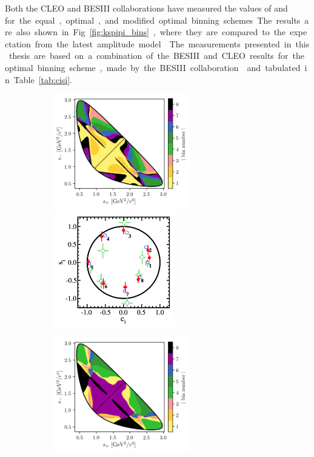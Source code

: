 Both the CLEO and BESIII collaborations have measured the values of \ci and \si for the equal, optimal, and modified optimal binning schemes. The results are also shown in Fig.~\ref{fig:kspipi_bins}, where they are  compared to the expectation from the latest amplitude model~\cite{Belle2018}. The measurements presented in this thesis are based on a combination of the BESIII and CLEO results for the optimal binning scheme, made by the BESIII collaboration~\cite{BESCISI} and tabulated in Table~\ref{tab:cisi}. 

\begin{figure}[p]
    \centering
    \begin{subfigure}{\columnwidth}
        \centering
        \includegraphics[height=5cm]{figures/theory/binnings/KsPiPi_equal.png}
        \includegraphics[height=5cm]{figures/theory/cisi_equal.png}
        \caption{}
        \label{fig:kspipi_bins_equal}
    \end{subfigure}
    \begin{subfigure}{\columnwidth}
        \centering
        \includegraphics[height=5cm]{figures/theory/binnings/KsPiPi_optimal.png}

\end{subfigure}
\end{figure}
